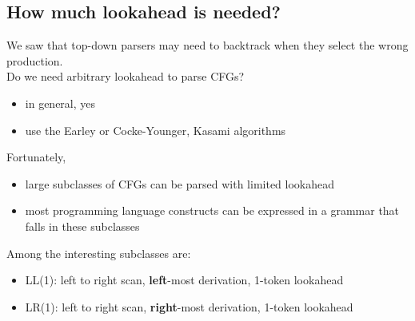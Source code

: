 \documentclass[10pt]{article}
\begin{document}
\subsection*{How much lookahead is needed?}
We saw that top-down parsers may need to backtrack when they select the wrong production.\\
Do we need arbitrary lookahead to parse CFGs?
\begin{itemize}
    \item in general, yes
    \item use the Earley or Cocke-Younger, Kasami algorithms
\end{itemize}
Fortunately,
\begin{itemize}
    \item large subclasses of CFGs can be parsed with limited lookahead
    \item most programming language constructs can be expressed in a grammar that falls in these subclasses
\end{itemize}
Among the interesting subclasses are:
\begin{itemize}
    \item LL(1): left to right scan, \textbf{left}-most derivation, 1-token lookahead
    \item LR(1): left to right scan, \textbf{right}-most derivation, 1-token lookahead
\end{itemize}
\end{document}
